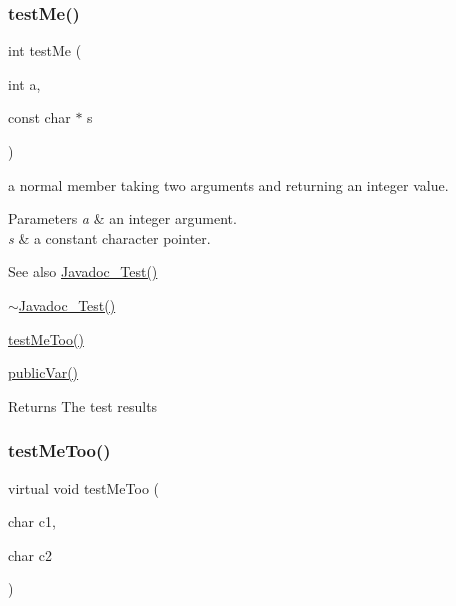 \subsubsection{\texorpdfstring{test\+Me()}{testMe()}}
{\footnotesize\ttfamily int test\+Me (\begin{DoxyParamCaption}\item[{int}]{a,  }\item[{const char $\ast$}]{s }\end{DoxyParamCaption})}

a normal member taking two arguments and returning an integer value. 
\begin{DoxyParams}{Parameters}
{\em a} & an integer argument. \\
\hline
{\em s} & a constant character pointer. \\
\hline
\end{DoxyParams}
\begin{DoxySeeAlso}{See also}
\hyperlink{class_javadoc___test_a7adb1076a9f698a2aa8a5ac0879f34ff}{Javadoc\+\_\+\+Test()} 

\hyperlink{class_javadoc___test_abda4d40f58e25104c7087e435fb0ddd0}{$\sim$\+Javadoc\+\_\+\+Test()} 

\hyperlink{class_javadoc___test_afe4f857536cdccd2f160ad619a61eba3}{test\+Me\+Too()} 

\hyperlink{class_javadoc___test_a292887ac25652b1d8448430f583378c3}{public\+Var()} 
\end{DoxySeeAlso}
\begin{DoxyReturn}{Returns}
The test results 
\end{DoxyReturn}
\mbox{\label{class_javadoc___test_afe4f857536cdccd2f160ad619a61eba3}} 
\subsubsection{\texorpdfstring{test\+Me\+Too()}{testMeToo()}}
{\footnotesize\ttfamily virtual void test\+Me\+Too (\begin{DoxyParamCaption}\item[{char}]{c1,  }\item[{char}]{c2 }\end{DoxyParamCaption})\hspace{0.3cm}{\ttfamily [pure virtual]}}

